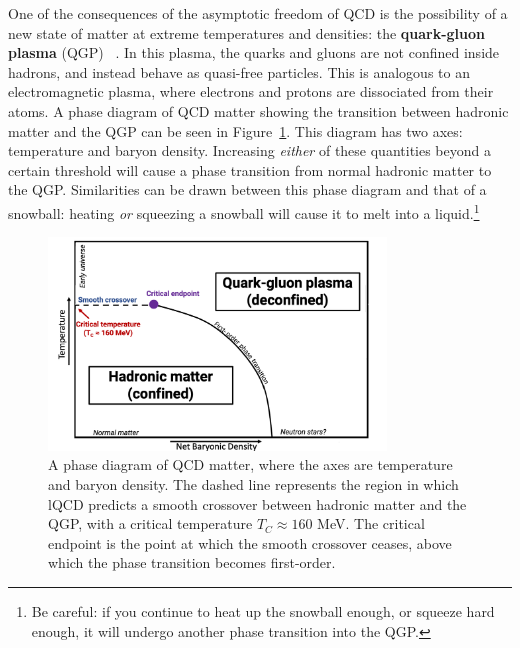 One of the consequences of the asymptotic freedom of QCD is the possibility of a new state of matter at extreme temperatures and densities: the \textbf{quark-gluon plasma} (QGP) ~\cite{QGP1, QGP2}. In this plasma, the quarks and gluons are not confined inside hadrons, and instead behave as quasi-free particles. This is analogous to an electromagnetic plasma, where electrons and protons are dissociated from their atoms. A phase diagram of QCD matter showing the transition between hadronic matter and the QGP can be seen in Figure~\ref{fig:qgp_phase_diagram}. This diagram has two axes: temperature and baryon density. Increasing \textit{either} of these quantities beyond a certain threshold will cause a phase transition from normal hadronic matter to the QGP. Similarities can be drawn between this phase diagram and that of a snowball: heating \textit{{or}} squeezing a snowball will cause it to melt into a liquid.\footnote{Be careful: if you continue to heat up the snowball enough, or squeeze hard enough, it will undergo another phase transition into the QGP.}  

\begin{figure}[h]
    \centering
    \includegraphics[width=0.8\textwidth]{figures/introduction/qgp_phase_diagram.png}
    \caption{A phase diagram of QCD matter, where the axes are temperature and baryon density. The dashed line represents the region in which lQCD predicts a smooth crossover between hadronic matter and the QGP, with a critical temperature $T_{C} \approx 160$ MeV. The critical endpoint is the point at which the smooth crossover ceases, above which the phase transition becomes first-order.}
    \label{fig:qgp_phase_diagram}
\end{figure}

\clearpage

